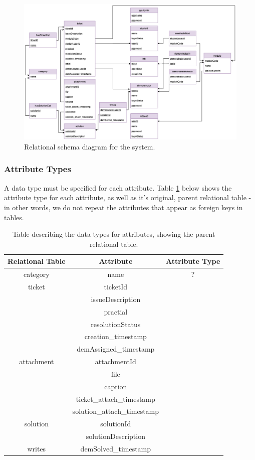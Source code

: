 \begin{figure}[H]
    \centering
    \includegraphics[width=\textwidth]{7design/images/relationalSchema.png}
    \caption{Relational schema diagram for the system.}
    \label{fig:relationalschema}
\end{figure}

\subsubsection{Attribute Types}
A data type must be specified for each attribute. Table \ref{table:atypetable} below shows the attribute type for each attribute, as well as it's original, parent relational table - in other words, we do not repeat the attributes that appear as foreign keys in tables.

\begin{table}[H]
\centering
\begin{tabular}{| c | c | c |}
\hline
 Relational Table & Attribute & Attribute Type \\ 
 \hline
  category & name & ? \\
  \hline
  ticket & ticketId & \\
  & issueDescription & \\
  & practial & \\
  & resolutionStatus & \\
  & creation\_timestamp & \\
  &  demAssigned\_timestamp & \\
  \hline 
  attachment & attachmentId & \\
  & file & \\
  & caption & \\
  & ticket\_attach\_timestamp & \\
  & solution\_attach\_timestamp & \\
  \hline
  solution & solutionId & \\
  & solutionDescription & \\
  \hline
  writes & demSolved\_timestamp & \\
  
  
 \hline
 
 \hline
\end{tabular}
\caption{Table describing the data types for attributes, showing the parent relational table.}
\label{table:atypetable}
\end{table}

